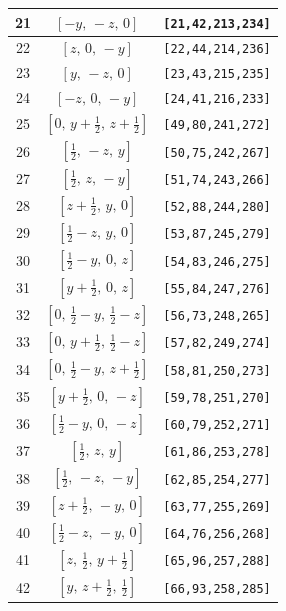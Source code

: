 \documentclass[fleqn,8pt]{jsarticle}
\begin{document}
\begin{longtable}{ccc}
21 & $\left[ - y,\, - z,\, 0 \right]$ & {\tt [21,42,213,234]} \\ \hline
22 & $\left[ z,\, 0,\, - y \right]$ & {\tt [22,44,214,236]} \\ \hline
23 & $\left[ y,\, - z,\, 0 \right]$ & {\tt [23,43,215,235]} \\ \hline
24 & $\left[ - z,\, 0,\, - y \right]$ & {\tt [24,41,216,233]} \\ \hline
25 & $\left[ 0,\, y + \frac{1}{2},\, z + \frac{1}{2} \right]$ & {\tt [49,80,241,272]} \\ \hline
26 & $\left[ \frac{1}{2},\, - z,\, y \right]$ & {\tt [50,75,242,267]} \\ \hline
27 & $\left[ \frac{1}{2},\, z,\, - y \right]$ & {\tt [51,74,243,266]} \\ \hline
28 & $\left[ z + \frac{1}{2},\, y,\, 0 \right]$ & {\tt [52,88,244,280]} \\ \hline
29 & $\left[ \frac{1}{2} - z,\, y,\, 0 \right]$ & {\tt [53,87,245,279]} \\ \hline
30 & $\left[ \frac{1}{2} - y,\, 0,\, z \right]$ & {\tt [54,83,246,275]} \\ \hline
31 & $\left[ y + \frac{1}{2},\, 0,\, z \right]$ & {\tt [55,84,247,276]} \\ \hline
32 & $\left[ 0,\, \frac{1}{2} - y,\, \frac{1}{2} - z \right]$ & {\tt [56,73,248,265]} \\ \hline
33 & $\left[ 0,\, y + \frac{1}{2},\, \frac{1}{2} - z \right]$ & {\tt [57,82,249,274]} \\ \hline
34 & $\left[ 0,\, \frac{1}{2} - y,\, z + \frac{1}{2} \right]$ & {\tt [58,81,250,273]} \\ \hline
35 & $\left[ y + \frac{1}{2},\, 0,\, - z \right]$ & {\tt [59,78,251,270]} \\ \hline
36 & $\left[ \frac{1}{2} - y,\, 0,\, - z \right]$ & {\tt [60,79,252,271]} \\ \hline
37 & $\left[ \frac{1}{2},\, z,\, y \right]$ & {\tt [61,86,253,278]} \\ \hline
38 & $\left[ \frac{1}{2},\, - z,\, - y \right]$ & {\tt [62,85,254,277]} \\ \hline
39 & $\left[ z + \frac{1}{2},\, - y,\, 0 \right]$ & {\tt [63,77,255,269]} \\ \hline
40 & $\left[ \frac{1}{2} - z,\, - y,\, 0 \right]$ & {\tt [64,76,256,268]} \\ \hline
41 & $\left[ z,\, \frac{1}{2},\, y + \frac{1}{2} \right]$ & {\tt [65,96,257,288]} \\ \hline
42 & $\left[ y,\, z + \frac{1}{2},\, \frac{1}{2} \right]$ & {\tt [66,93,258,285]} \\ \hline

\end{longtable}
\end{document}
